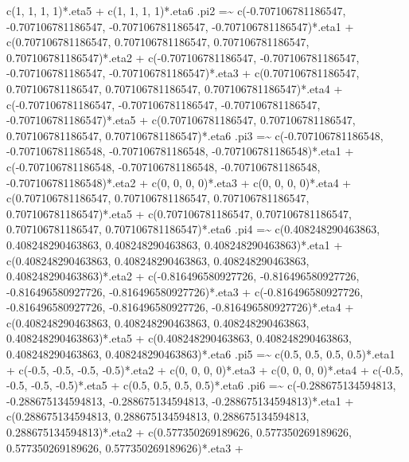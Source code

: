 \documentclass[
]{book}
\newenvironment{Shaded}{\begin{snugshade}}{\end{snugshade}}
\newcommand{\StringTok}[1]{\textcolor[rgb]{0.31,0.60,0.02}{#1}}
\begin{document}
\begin{Shaded}
\begin{Highlighting}[]
\StringTok{    c(1, 1, 1, 1)*.eta5 +}
\StringTok{    c(1, 1, 1, 1)*.eta6}
\StringTok{.pi2 =\textasciitilde{}}
\StringTok{    c({-}0.707106781186547, {-}0.707106781186547, {-}0.707106781186547, {-}0.707106781186547)*.eta1 +}
\StringTok{    c(0.707106781186547, 0.707106781186547, 0.707106781186547, 0.707106781186547)*.eta2 +}
\StringTok{    c({-}0.707106781186547, {-}0.707106781186547, {-}0.707106781186547, {-}0.707106781186547)*.eta3 +}
\StringTok{    c(0.707106781186547, 0.707106781186547, 0.707106781186547, 0.707106781186547)*.eta4 +}
\StringTok{    c({-}0.707106781186547, {-}0.707106781186547, {-}0.707106781186547, {-}0.707106781186547)*.eta5 +}
\StringTok{    c(0.707106781186547, 0.707106781186547, 0.707106781186547, 0.707106781186547)*.eta6}
\StringTok{.pi3 =\textasciitilde{}}
\StringTok{    c({-}0.707106781186548, {-}0.707106781186548, {-}0.707106781186548, {-}0.707106781186548)*.eta1 +}
\StringTok{    c({-}0.707106781186548, {-}0.707106781186548, {-}0.707106781186548, {-}0.707106781186548)*.eta2 +}
\StringTok{    c(0, 0, 0, 0)*.eta3 +}
\StringTok{    c(0, 0, 0, 0)*.eta4 +}
\StringTok{    c(0.707106781186547, 0.707106781186547, 0.707106781186547, 0.707106781186547)*.eta5 +}
\StringTok{    c(0.707106781186547, 0.707106781186547, 0.707106781186547, 0.707106781186547)*.eta6}
\StringTok{.pi4 =\textasciitilde{}}
\StringTok{    c(0.408248290463863, 0.408248290463863, 0.408248290463863, 0.408248290463863)*.eta1 +}
\StringTok{    c(0.408248290463863, 0.408248290463863, 0.408248290463863, 0.408248290463863)*.eta2 +}
\StringTok{    c({-}0.816496580927726, {-}0.816496580927726, {-}0.816496580927726, {-}0.816496580927726)*.eta3 +}
\StringTok{    c({-}0.816496580927726, {-}0.816496580927726, {-}0.816496580927726, {-}0.816496580927726)*.eta4 +}
\StringTok{    c(0.408248290463863, 0.408248290463863, 0.408248290463863, 0.408248290463863)*.eta5 +}
\StringTok{    c(0.408248290463863, 0.408248290463863, 0.408248290463863, 0.408248290463863)*.eta6}
\StringTok{.pi5 =\textasciitilde{}}
\StringTok{    c(0.5, 0.5, 0.5, 0.5)*.eta1 +}
\StringTok{    c({-}0.5, {-}0.5, {-}0.5, {-}0.5)*.eta2 +}
\StringTok{    c(0, 0, 0, 0)*.eta3 +}
\StringTok{    c(0, 0, 0, 0)*.eta4 +}
\StringTok{    c({-}0.5, {-}0.5, {-}0.5, {-}0.5)*.eta5 +}
\StringTok{    c(0.5, 0.5, 0.5, 0.5)*.eta6}
\StringTok{.pi6 =\textasciitilde{}}
\StringTok{    c({-}0.288675134594813, {-}0.288675134594813, {-}0.288675134594813, {-}0.288675134594813)*.eta1 +}
\StringTok{    c(0.288675134594813, 0.288675134594813, 0.288675134594813, 0.288675134594813)*.eta2 +}
\StringTok{    c(0.577350269189626, 0.577350269189626, 0.577350269189626, 0.577350269189626)*.eta3 +}

\end{Highlighting}
\end{Shaded}
\end{document}
